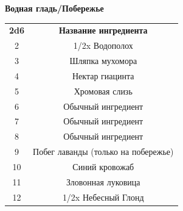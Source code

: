 \documentclass[a4paper, 9pt, twocolumn]{book}
\begin{document}
	\begin{table}[H]
		
		{\Large \textbf{Водная гладь/Побережье}}
		
		\medspace 
		
		\centering 
		
		\begin{tabularx}{\linewidth}{c C}
			
			\textbf{2d6} & \textbf{Название ингредиента} \\
			
			2 & 1/2x Водополох \\
			
			3 & Шляпка мухомора \\
			
			4 & Нектар гиацинта \\
			
			5 & Хромовая слизь \\
			
			6 & Обычный ингредиент \\
			
			7 & Обычный ингредиент \\
			
			8 & Обычный ингредиент \\
			
			9 & Побег лаванды (только на побережье) \\
			
			10 & Синий кровожаб  \\
			
			11 & Зловонная луковица  \\
			
			12 & 1/2x Небесный Глонд \\
		\end{tabularx}
	\end{table}
\end{document}
